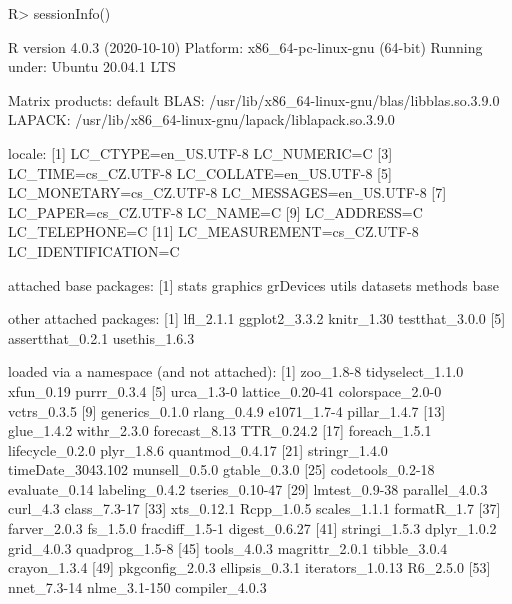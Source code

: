 \documentclass{article}\usepackage[]{graphicx}\usepackage[]{color}
\begin{document}
\begin{Schunk}
\begin{Sinput}
R> sessionInfo()
\end{Sinput}
\begin{Soutput}
R version 4.0.3 (2020-10-10)
Platform: x86_64-pc-linux-gnu (64-bit)
Running under: Ubuntu 20.04.1 LTS

Matrix products: default
BLAS:   /usr/lib/x86_64-linux-gnu/blas/libblas.so.3.9.0
LAPACK: /usr/lib/x86_64-linux-gnu/lapack/liblapack.so.3.9.0

locale:
 [1] LC_CTYPE=en_US.UTF-8       LC_NUMERIC=C              
 [3] LC_TIME=cs_CZ.UTF-8        LC_COLLATE=en_US.UTF-8    
 [5] LC_MONETARY=cs_CZ.UTF-8    LC_MESSAGES=en_US.UTF-8   
 [7] LC_PAPER=cs_CZ.UTF-8       LC_NAME=C                 
 [9] LC_ADDRESS=C               LC_TELEPHONE=C            
[11] LC_MEASUREMENT=cs_CZ.UTF-8 LC_IDENTIFICATION=C       

attached base packages:
[1] stats     graphics  grDevices utils     datasets  methods   base     

other attached packages:
[1] lfl_2.1.1        ggplot2_3.3.2    knitr_1.30       testthat_3.0.0  
[5] assertthat_0.2.1 usethis_1.6.3   

loaded via a namespace (and not attached):
 [1] zoo_1.8-8         tidyselect_1.1.0  xfun_0.19         purrr_0.3.4      
 [5] urca_1.3-0        lattice_0.20-41   colorspace_2.0-0  vctrs_0.3.5      
 [9] generics_0.1.0    rlang_0.4.9       e1071_1.7-4       pillar_1.4.7     
[13] glue_1.4.2        withr_2.3.0       forecast_8.13     TTR_0.24.2       
[17] foreach_1.5.1     lifecycle_0.2.0   plyr_1.8.6        quantmod_0.4.17  
[21] stringr_1.4.0     timeDate_3043.102 munsell_0.5.0     gtable_0.3.0     
[25] codetools_0.2-18  evaluate_0.14     labeling_0.4.2    tseries_0.10-47  
[29] lmtest_0.9-38     parallel_4.0.3    curl_4.3          class_7.3-17     
[33] xts_0.12.1        Rcpp_1.0.5        scales_1.1.1      formatR_1.7      
[37] farver_2.0.3      fs_1.5.0          fracdiff_1.5-1    digest_0.6.27    
[41] stringi_1.5.3     dplyr_1.0.2       grid_4.0.3        quadprog_1.5-8   
[45] tools_4.0.3       magrittr_2.0.1    tibble_3.0.4      crayon_1.3.4     
[49] pkgconfig_2.0.3   ellipsis_0.3.1    iterators_1.0.13  R6_2.5.0         
[53] nnet_7.3-14       nlme_3.1-150      compiler_4.0.3   
\end{Soutput}
\end{Schunk}
\end{document}
